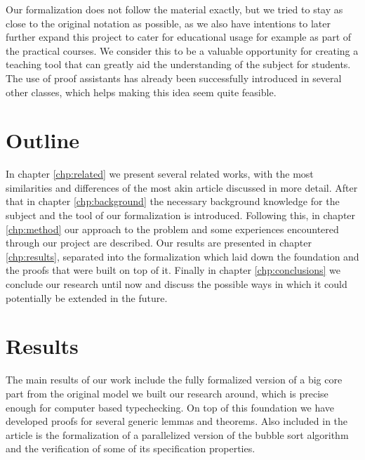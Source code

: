 Our formalization does not follow the material exactly, but we tried to stay as close to the original notation as possible, as we also have intentions to later further expand this project to cater for educational usage for example as part of the practical courses. We consider this to be a valuable opportunity for creating a teaching tool that can greatly aid the understanding of the subject for students. The use of proof assistants has already been successfully introduced in several other classes\cite{formalsemantics-typesystems}, which helps making this idea seem quite feasible.

\section{Outline}

In chapter \ref{chp:related} we present several related works, with the most similarities and differences of the most akin article discussed in more detail. After that in chapter \ref{chp:background} the necessary background knowledge for the subject and the tool of our formalization is introduced. Following this, in chapter \ref{chp:method} our approach to the problem and some experiences encountered through our project are described. Our results are presented in chapter \ref{chp:results}, separated into the formalization which laid down the foundation and the proofs that were built on top of it. Finally in chapter \ref{chp:conclusions} we conclude our research until now and discuss the possible ways in which it could potentially be extended in the future.

\section{Results}

The main results of our work include the fully formalized version of a big core part from the original model we built our research around, which is precise enough for computer based typechecking. On top of this foundation we have developed proofs for several generic lemmas and theorems. Also included in the article is the formalization of a parallelized version of the bubble sort algorithm and the verification of some of its specification properties.

